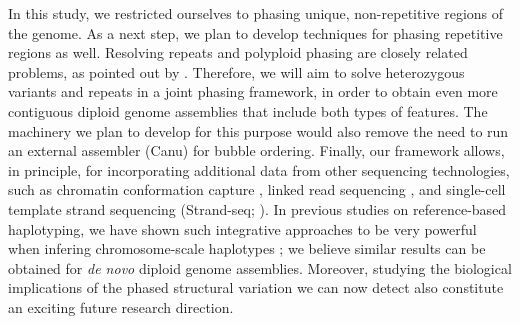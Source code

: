 In this study, we restricted ourselves to phasing unique, non-repetitive regions of the genome.
As a next step, we plan to develop techniques for phasing repetitive regions as well.
Resolving repeats and polyploid phasing are closely related problems, as pointed out by \cite{Chaisson2017}.
Therefore, we will aim to solve heterozygous variants and repeats in a joint phasing framework, in order to obtain even more contiguous diploid genome assemblies that include both types of features.
The machinery we plan to develop for this purpose would also remove the need to run an external assembler (Canu) for bubble ordering.
Finally, our framework allows, in principle, for incorporating additional data from other sequencing technologies, such as chromatin conformation capture \citep{burton2013chromosome}, linked read sequencing \citep{weisenfeld2017direct}, and single-cell template strand sequencing (Strand-seq; \citealp{Porubsky2016}).
In previous studies on reference-based haplotyping, we have shown such integrative approaches to be very powerful when infering chromosome-scale haplotypes \citep{porubsky2017dense,chaisson2017multi}; we believe similar results can be obtained for \textit{de novo} diploid genome assemblies.
Moreover, studying the biological implications of the phased structural variation we can now detect also constitute an exciting future research direction.

